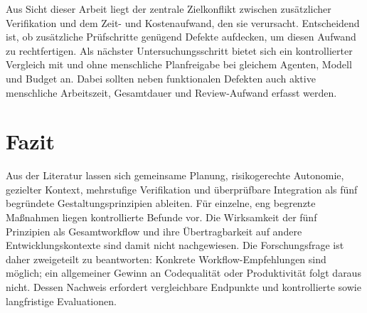 \documentclass[conference]{IEEEtran}
\begin{document}
Aus Sicht dieser Arbeit liegt der zentrale Zielkonflikt zwischen zusätzlicher Verifikation und dem Zeit- und Kostenaufwand, den sie verursacht. Entscheidend ist, ob zusätzliche Prüfschritte genügend Defekte aufdecken, um diesen Aufwand zu rechtfertigen. Als nächster Untersuchungsschritt bietet sich ein kontrollierter Vergleich mit und ohne menschliche Planfreigabe bei gleichem Agenten, Modell und Budget an. Dabei sollten neben funktionalen Defekten auch aktive menschliche Arbeitszeit, Gesamtdauer und Review-Aufwand erfasst werden.

\section{Fazit}
Aus der Literatur lassen sich gemeinsame Planung, risikogerechte Autonomie, gezielter Kontext, mehrstufige Verifikation und überprüfbare Integration als fünf begründete Gestaltungsprinzipien ableiten. Für einzelne, eng begrenzte Maßnahmen liegen kontrollierte Befunde vor. Die Wirksamkeit der fünf Prinzipien als Gesamtworkflow und ihre Übertragbarkeit auf andere Entwicklungskontexte sind damit nicht nachgewiesen. Die Forschungsfrage ist daher zweigeteilt zu beantworten: Konkrete Workflow-Empfehlungen sind möglich; ein allgemeiner Gewinn an Codequalität oder Produktivität folgt daraus nicht. Dessen Nachweis erfordert vergleichbare Endpunkte und kontrollierte sowie langfristige Evaluationen.
\end{document}
